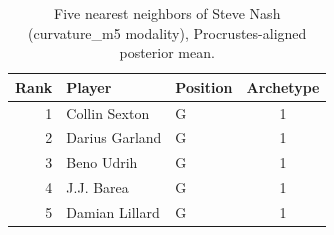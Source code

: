 \begin{table}[htbp]
  \centering\small
  \begin{tabular}{rllc}
    \toprule
    Rank & Player & Position & Archetype \\
    \midrule
    1 & Collin Sexton & G & 1 \\
    2 & Darius Garland & G & 1 \\
    3 & Beno Udrih & G & 1 \\
    4 & J.J. Barea & G & 1 \\
    5 & Damian Lillard & G & 1 \\
    \bottomrule
  \end{tabular}
  \caption{Five nearest neighbors of Steve Nash (curvature_m5 modality), Procrustes-aligned posterior mean.}
  \label{tab:Steve_Nash_neighbors_curvature_m5}
\end{table}

